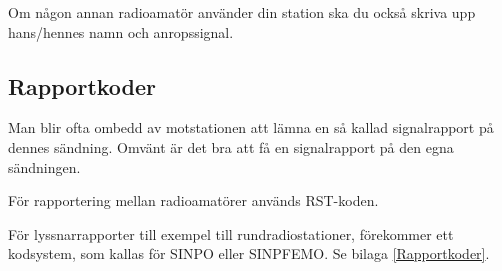 Om någon annan radioamatör använder din station ska du också skriva
upp hans/hennes namn och anropssignal.

\subsection{Rapportkoder}

Man blir ofta ombedd av motstationen att lämna en så kallad signalrapport på
dennes sändning.
Omvänt är det bra att få en signalrapport på den egna sändningen.

För rapportering mellan radioamatörer används RST-koden.

För lyssnarrapporter till exempel till rundradiostationer, förekommer ett
kodsystem, som kallas för SINPO eller SINPFEMO. Se bilaga \ref{Rapportkoder}.



